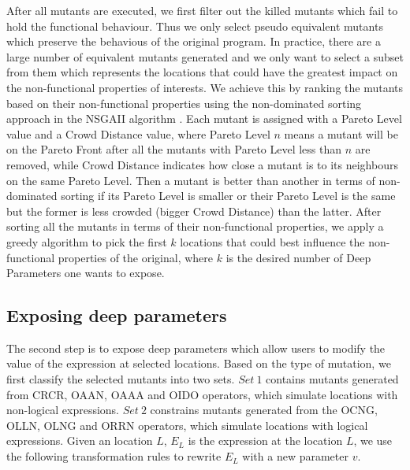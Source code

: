 After all mutants are executed, we first filter out the killed mutants which fail to hold the functional behaviour.  Thus we only select pseudo equivalent mutants which preserve the behavious of the original program. 
In practice, there are a large number of equivalent mutants \cite{5477100} generated and we only want to select a subset from them which represents the locations that could have the greatest impact on the non-functional properties of interests.  
We achieve this by ranking the mutants based on their non-functional properties using the non-dominated sorting approach in the NSGAII algorithm \cite{996017}. Each mutant is assigned with a Pareto Level value and a Crowd Distance value, where Pareto Level $n$ means a mutant will be on the Pareto Front after all the mutants with Pareto Level less than $n$ are removed, while Crowd Distance indicates how close a mutant is to its neighbours on the same Pareto Level. Then a mutant is better than another in terms of non-dominated sorting if its Pareto Level is smaller or their Pareto Level is the same but the former is less crowded (bigger Crowd Distance) than the latter. After sorting all the mutants in terms of their non-functional properties, we apply a greedy algorithm to pick the first $k$ locations that could best influence the non-functional properties of the original, where $k$ is the desired number of Deep Parameters one wants to expose.




\subsection{Exposing deep parameters}
The second step is to expose deep parameters which allow users to modify the value of the expression at selected locations. Based on the type of mutation, we first classify the selected mutants into two sets. $Set\ 1$ contains mutants generated from CRCR, OAAN, OAAA and OIDO operators, which simulate locations with non-logical expressions. $Set\ 2$ constrains mutants generated from the OCNG, OLLN, OLNG and ORRN operators, which simulate locations with logical expressions. 
Given an location $L$, $E_L$ is the expression at the location $L$, we use the following transformation rules to rewrite $E_L$ with a new parameter $v$.

